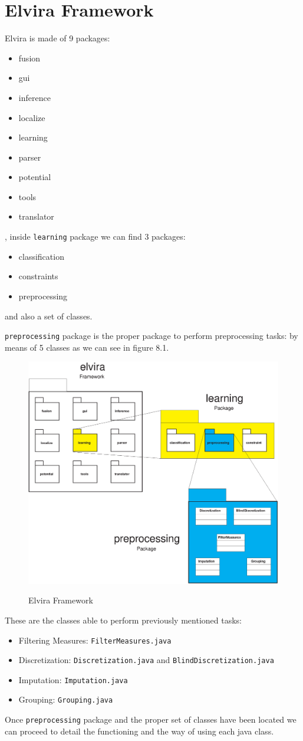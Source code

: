 \section{Elvira Framework}
Elvira is made of 9 packages:
\begin{itemize}
	\item	fusion
	\item	gui
	\item	inference
	\item	localize
	\item	learning
	\item	parser
	\item	potential
	\item	tools
	\item	translator 
\end{itemize}
, inside \verb=learning= package we can find 3 packages:
\begin{itemize}
	\item	classification
	\item	constraints
	\item	preprocessing
\end{itemize}
and also a set of classes.

\verb=preprocessing= package is the proper package to perform preprocessing tasks:
by means of 5 classes as we can see in figure 8.1.
\begin{figure}
\includegraphics[width=130mm]{Learning/Preprocessing/fig/figure-8.01.eps} 
\label{cap08:01}
\caption{Elvira Framework}
\end{figure}
These are the classes able to perform previously mentioned tasks:
\begin{itemize}
	\item	Filtering Measures: \verb=FilterMeasures.java=
	\item	Discretization: \verb=Discretization.java= and \verb=BlindDiscretization.java=
	\item	Imputation: \verb=Imputation.java=
	\item	Grouping: \verb=Grouping.java=
\end{itemize}

Once \verb=preprocessing= package and the proper set of classes have been located we can proceed
to detail the functioning and the way of using each java class.
